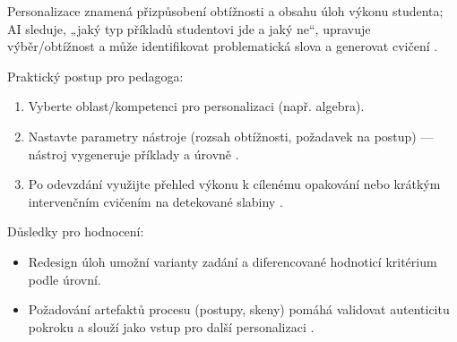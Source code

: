 Personalizace znamená přizpůsobení obtížnosti a obsahu úloh výkonu studenta; AI sleduje, „jaký typ příkladů studentovi jde a jaký ne“, upravuje výběr/obtížnost a může identifikovat problematická slova a generovat cvičení \cite{kb_ai_101_tipu_pdf_04e4a115_page_8_1, kb_ai_101_tipu_pdf_04e4a115_page_7_1}.

Praktický postup pro pedagoga: \begin{enumerate}
\item Vyberte oblast/kompetenci pro personalizaci (např. algebra).
\item Nastavte parametry nástroje (rozsah obtížnosti, požadavek na postup) — nástroj vygeneruje příklady a úrovně \cite{kb_ai_101_tipu_pdf_04e4a115_page_8_1}.
\item Po odevzdání využijte přehled výkonu k cílenému opakování nebo krátkým intervenčním cvičením na detekované slabiny \cite{kb_ai_101_tipu_pdf_04e4a115_page_7_1}.
\end{enumerate}

Důsledky pro hodnocení: \begin{itemize}
\item Redesign úloh umožní varianty zadání a diferencované hodnoticí kritérium podle úrovní.
\item Požadování artefaktů procesu (postupy, skeny) pomáhá validovat autenticitu pokroku a slouží jako vstup pro další personalizaci \cite{kb_ai_101_tipu_pdf_04e4a115_page_8_1}.
\end{itemize}
